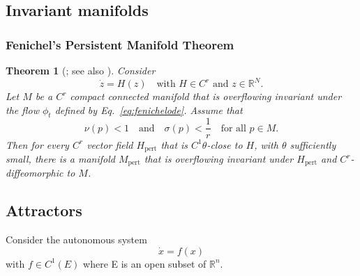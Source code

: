 \documentclass{article}
\newtheorem{theorem}{Theorem}
\theoremstyle{definition}
\theoremstyle{remark}
\newcommand{\reals}{\mathbb{R}}
\newcounter{ct}
\begin{document}
\subsection{Invariant manifolds}
\citep{roberts1989invariant,
kalitin2021attractors}

\citep{hirsch1970invariant}
\citep{wiggins1994nhim}
\citep{jones1995gspt}
\citep{kuehn2015multipletimescale}



\subsubsection{Fenichel's Persistent Manifold Theorem}
\begin{theorem}[\citep{fenichel1971persistence}; see also \citep{kuehn2015multipletimescale}]
 Consider
\begin{equation}\label{eq:fenichelode}
\dot{z} = H(z) \quad \text{with } H \in C^r \text{ and } z \in \mathbb{R}^N. 
\end{equation}
Let \( M \) be a \( C^r \) compact connected manifold that is overflowing invariant under the flow \( \phi_t \) defined by Eq.~\ref{eq:fenichelode}. Assume that
\begin{equation}
\nu(p) < 1 \quad \text{and} \quad \sigma(p) < \frac{1}{r} \quad \text{for all } p \in M. 
\end{equation}
Then for every \( C^r \) vector field \( H_{\text{pert}} \) that is \( C^1 \theta \)-close to \( H \), with \( \theta \) sufficiently small, there is a manifold \( M_{\text{pert}} \) that is overflowing invariant under \( H_{\text{pert}} \) and \( C^r \)-diffeomorphic to \( M \).
\end{theorem}





\subsection{Attractors}
Consider the autonomous system
\begin{equation}\label{eq:attractorode}
\dot x = f(x)
\end{equation}
with \(f \in C^1(E)\) where E is an open subset of \(\reals^n\). 
\end{document}
